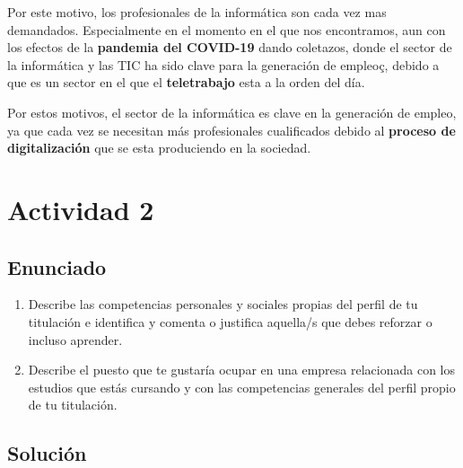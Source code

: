 Por este motivo, los profesionales de la informática son cada vez mas demandados. Especialmente en el momento en el que nos encontramos, aun con los efectos de la  \textbf{pandemia del COVID-19} dando coletazos, donde el sector de la informática y las TIC ha sido clave para la generación de empleoç, debido a que es un sector en el que el \textbf{teletrabajo} esta a la orden del día.

Por estos motivos, el sector de la informática es clave en la generación de empleo, ya que cada vez se necesitan más profesionales cualificados debido al \textbf{proceso de digitalización} que se esta produciendo en la sociedad.

\section{Actividad 2}
\subsection{Enunciado}
    \begin{enumerate}[label=(\alph*)]
    \item Describe las competencias personales y sociales propias del perfil de tu titulación e identifica y comenta o justifica aquella/s que debes reforzar o incluso aprender.
    \item Describe el  puesto que te gustaría ocupar en una empresa relacionada con los estudios que estás cursando y con las competencias generales del perfil propio de tu titulación.
\end{enumerate}

\subsection{Solución}

